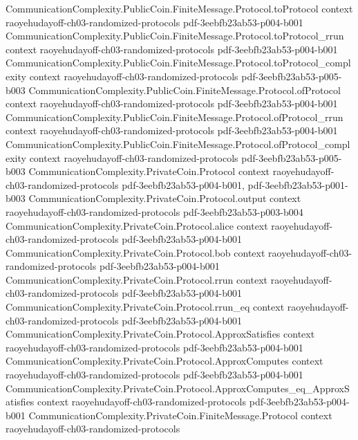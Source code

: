 \begin{theorem}
\proofstep
  {CommunicationComplexity.PublicCoin.FiniteMessage.Protocol.toProtocol}
  {context}
  {raoyehudayoff-ch03-randomized-protocols}
  {pdf-3eebfb23ab53-p004-b001}
\proofstep
  {CommunicationComplexity.PublicCoin.FiniteMessage.Protocol.toProtocol_rrun}
  {context}
  {raoyehudayoff-ch03-randomized-protocols}
  {pdf-3eebfb23ab53-p004-b001}
\proofstep
  {CommunicationComplexity.PublicCoin.FiniteMessage.Protocol.toProtocol_complexity}
  {context}
  {raoyehudayoff-ch03-randomized-protocols}
  {pdf-3eebfb23ab53-p005-b003}
\proofstep
  {CommunicationComplexity.PublicCoin.FiniteMessage.Protocol.ofProtocol}
  {context}
  {raoyehudayoff-ch03-randomized-protocols}
  {pdf-3eebfb23ab53-p004-b001}
\proofstep
  {CommunicationComplexity.PublicCoin.FiniteMessage.Protocol.ofProtocol_rrun}
  {context}
  {raoyehudayoff-ch03-randomized-protocols}
  {pdf-3eebfb23ab53-p004-b001}
\proofstep
  {CommunicationComplexity.PublicCoin.FiniteMessage.Protocol.ofProtocol_complexity}
  {context}
  {raoyehudayoff-ch03-randomized-protocols}
  {pdf-3eebfb23ab53-p005-b003}
\proofstep
  {CommunicationComplexity.PrivateCoin.Protocol}
  {context}
  {raoyehudayoff-ch03-randomized-protocols}
  {pdf-3eebfb23ab53-p004-b001,
    pdf-3eebfb23ab53-p001-b003}
\proofstep
  {CommunicationComplexity.PrivateCoin.Protocol.output}
  {context}
  {raoyehudayoff-ch03-randomized-protocols}
  {pdf-3eebfb23ab53-p003-b004}
\proofstep
  {CommunicationComplexity.PrivateCoin.Protocol.alice}
  {context}
  {raoyehudayoff-ch03-randomized-protocols}
  {pdf-3eebfb23ab53-p004-b001}
\proofstep
  {CommunicationComplexity.PrivateCoin.Protocol.bob}
  {context}
  {raoyehudayoff-ch03-randomized-protocols}
  {pdf-3eebfb23ab53-p004-b001}
\proofstep
  {CommunicationComplexity.PrivateCoin.Protocol.rrun}
  {context}
  {raoyehudayoff-ch03-randomized-protocols}
  {pdf-3eebfb23ab53-p004-b001}
\proofstep
  {CommunicationComplexity.PrivateCoin.Protocol.rrun_eq}
  {context}
  {raoyehudayoff-ch03-randomized-protocols}
  {pdf-3eebfb23ab53-p004-b001}
\proofstep
  {CommunicationComplexity.PrivateCoin.Protocol.ApproxSatisfies}
  {context}
  {raoyehudayoff-ch03-randomized-protocols}
  {pdf-3eebfb23ab53-p004-b001}
\proofstep
  {CommunicationComplexity.PrivateCoin.Protocol.ApproxComputes}
  {context}
  {raoyehudayoff-ch03-randomized-protocols}
  {pdf-3eebfb23ab53-p004-b001}
\proofstep
  {CommunicationComplexity.PrivateCoin.Protocol.ApproxComputes_eq_ApproxSatisfies}
  {context}
  {raoyehudayoff-ch03-randomized-protocols}
  {pdf-3eebfb23ab53-p004-b001}
\proofstep
  {CommunicationComplexity.PrivateCoin.FiniteMessage.Protocol}
  {context}
  {raoyehudayoff-ch03-randomized-protocols}

\end{theorem}
